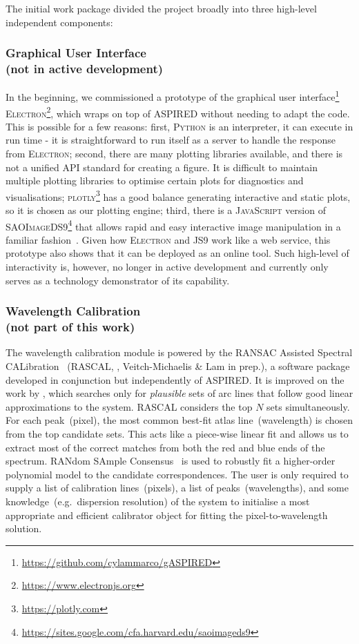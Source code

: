 \documentclass[twocolumn, linenumbers]{aastex631}
\begin{document}
The initial
work package divided the project broadly into three high-level independent
components:

\subsubsection*{Graphical User Interface\\(not in active development)}
In the beginning, we commissioned a prototype of the graphical user
interface\footnote{\url{https://github.com/cylammarco/gASPIRED}}
\textsc{Electron}\footnote{\url{https://www.electronjs.org}}, which wraps on top of
\textsc{ASPIRED} without needing to adapt the code. This is
possible for a few reasons: first, \textsc{Python} is an interpreter, it can execute
in run time - it is straightforward to run itself as a server to handle the response from 
\textsc{Electron}; second, there are many plotting libraries available, and there is
not a unified API standard for creating a figure. It is difficult to maintain
multiple plotting libraries to optimise certain plots for diagnostics and
visualisations; \textsc{plotly}\footnote{\url{https://plotly.com}} has a good balance
generating interactive and static plots, so it is chosen as our plotting engine; third,
there is a \textsc{JavaScript} version of
\textsc{SAOImageDS9}\footnote{\url{https://sites.google.com/cfa.harvard.edu/saoimageds9}}
that allows rapid and easy interactive image manipulation in a familiar
fashion~\citep{eric_mandel_2021_596052}. Given how \textsc{Electron} and
\textsc{JS9} work like a web service, this prototype also shows that it can 
be deployed as an online tool. Such high-level of interactivity is, however, no longer
in active development and currently only serves as a technology demonstrator of its capability.

\subsubsection*{Wavelength Calibration\\(not part of this work)}
The wavelength calibration module is powered by the RANSAC Assisted Spectral CALibration
~(\textsc{RASCAL}, \citealt{2020zndo...4117517V, 2020ASPC..527..627V}, Veitch-Michaelis
\& Lam in prep.), a software package developed in conjunction but independently of \textsc{ASPIRED}.
It is improved on the work by \citet{2018ApOpt..57.6876S}, which searches only for
\textit{plausible} sets of arc lines that follow good linear approximations to the
system. \textsc{RASCAL} considers the top $N$ sets simultaneously. For each peak~(pixel),
the most common best-fit atlas line~(wavelength) is chosen from the top candidate
sets. This acts like a piece-wise linear fit and allows us to extract most of
the correct matches from both the red and blue ends of the spectrum. RANdom
SAmple Consensus~\citep[RANSAC,][]{fischler_bolles_1981} is used to robustly
fit a higher-order polynomial model to the candidate correspondences. The user
is only required to supply a list of calibration lines~(pixels), a
list of peaks~(wavelengths), and some knowledge~(e.g.\ dispersion resolution) of
the system to initialise a most appropriate and efficient calibrator object for
fitting the pixel-to-wavelength solution.
\end{document}
